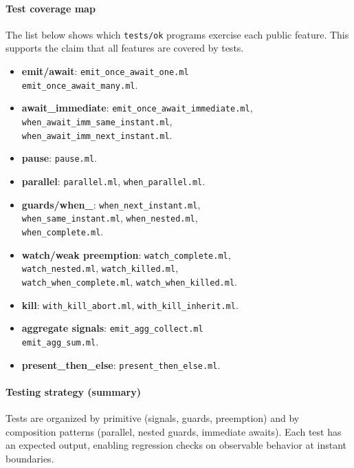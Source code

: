 \paragraph{Test coverage map}\label{sec:feature-tests}
The list below shows which \texttt{tests/ok} programs exercise each public
feature. This supports the claim that all features are covered by tests.
\begin{itemize}
\item \textbf{emit/await}:
  \texttt{emit\_once\_await\_one.ml} \\
  \texttt{emit\_once\_await\_many.ml}.
\item \textbf{await\_immediate}: \texttt{emit\_once\_await\_immediate.ml},
  \\ \texttt{when\_await\_imm\_same\_instant.ml},
  \\ \texttt{when\_await\_imm\_next\_instant.ml}.
\item \textbf{pause}: \texttt{pause.ml}.
\item \textbf{parallel}: \texttt{parallel.ml}, \texttt{when\_parallel.ml}.
\item \textbf{guards/when\_}: \texttt{when\_next\_instant.ml},
  \\ \texttt{when\_same\_instant.ml}, \texttt{when\_nested.ml},
  \\ \texttt{when\_complete.ml}.
\item \textbf{watch/weak preemption}: \texttt{watch\_complete.ml},
  \\ \texttt{watch\_nested.ml}, \texttt{watch\_killed.ml},
  \\ \texttt{watch\_when\_complete.ml}, \texttt{watch\_when\_killed.ml}.
\item \textbf{kill}: \texttt{with\_kill\_abort.ml}, \texttt{with\_kill\_inherit.ml}.
\item \textbf{aggregate signals}:
  \texttt{emit\_agg\_collect.ml} \\
  \texttt{emit\_agg\_sum.ml}.
\item \textbf{present\_then\_else}: \texttt{present\_then\_else.ml}.
\end{itemize}

\paragraph{Testing strategy (summary)}
Tests are organized by primitive (signals, guards, preemption) and by
composition patterns (parallel, nested guards, immediate awaits). Each test
has an expected output, enabling regression checks on observable behavior at
instant boundaries.
